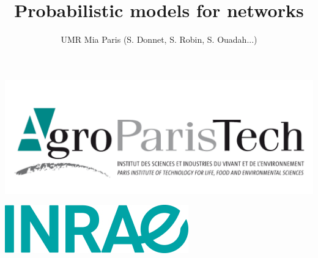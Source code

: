 \documentclass[compress,10pt]{beamer}
\title{Probabilistic models for  networks}%
\author{UMR Mia Paris (S. Donnet, S. Robin, S. Ouadah...) }
\date{}
\begin{document}

\begin{frame}
\titlepage

\vspace{-.5cm}
\includegraphics[scale=.1]{plots/AgroParisTech_-_logo.PNG}
\vspace{-1.2cm}
\begin{flushright}
 \includegraphics[scale=.3]{plots/Logo-INRAE.jpg}
 \end{flushright}

\end{frame}


\end{document}
